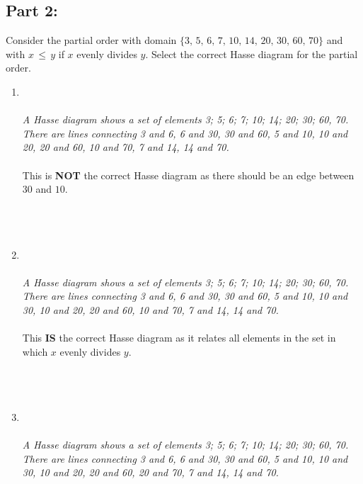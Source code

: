 \documentclass{amsart}
\theoremstyle{definition}
\theoremstyle{Exercise}
\theoremstyle{remark}
\theoremstyle{rule}
\numberwithin{equation}{section}
\begin{document}
\subsection*{Part 2:}
Consider the partial order with domain $\{3,\, 5,\, 6, \,7,\, 10,\, 14,\, 20,\, 30,\, 60,\, 70\}$ and with $x\,\leq \,y$ if $x$ evenly divides $y$. Select the correct Hasse diagram for the partial order.\\

\begin{enumerate}[label=(\alph*)]
\item
{}
\\\\
{\color{blue}{\bf Figure 2:} \emph{A Hasse diagram shows a set of elements {3; 5; 6; 7; 10; 14; 20; 30; 60, 70}. There are lines connecting 3 and 6, 6 and 30, 30 and 60, 5 and 10, 10 and 20, 20 and 60, 10 and 70, 7 and 14, 14 and 70.
}
}
\\
\\
  This is {\large \bf NOT} the correct Hasse diagram as there should be an edge between $30$ and $10$.
\\\\
\newpage
~\\~\\
\item
{}
\\\\
{\color{blue}{\bf Figure 3:} \emph{A Hasse diagram shows a set of elements {3; 5; 6; 7; 10; 14; 20; 30; 60, 70}. There are lines connecting 3 and 6, 6 and 30, 30 and 60, 5 and 10, 10 and 30, 10 and 20, 20 and 60, 10 and 70, 7 and 14, 14 and 70.
}
}
\\
\\
  This {\large \bf IS} the correct Hasse diagram as it relates all elements in the set in which $x$ evenly divides $y$.
\\\\
\newpage
~\\~\\
\item
{}
\\\\
{\color{blue}{\bf Figure 4:} \emph{A Hasse diagram shows a set of elements {3; 5; 6; 7; 10; 14; 20; 30; 60, 70}. There are lines connecting 3 and 6, 6 and 30, 30 and 60, 5 and 10, 10 and 30, 10 and 20, 20 and 60, 20 and 70, 7 and 14, 14 and 70.
}}
\end{enumerate}
\end{document}

